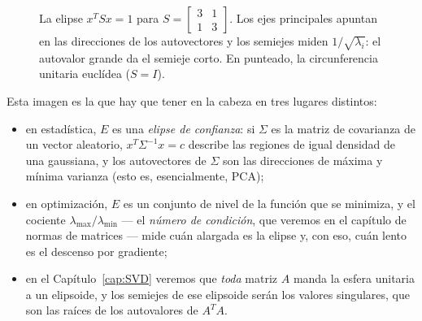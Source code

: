 \begin{figure}[htbp]
\centering
{}
\caption{La elipse $x^TSx=1$ para $S=\left[\begin{smallmatrix}3&1\\1&3\end{smallmatrix}\right]$.
Los ejes principales apuntan en las direcciones de los autovectores y los
semiejes miden $1/\sqrt{\lambda_i}$: el autovalor grande da el semieje corto.
En punteado, la circunferencia unitaria euclídea ($S=I$).}
\label{fig:elipse}
\end{figure}

Esta imagen es la que hay que tener en la cabeza en tres lugares distintos:

\begin{itemize}
\item en estadística, $E$ es una \emph{elipse de confianza}: si $\Sigma$ es la
matriz de covarianza de un vector aleatorio, $x^T\Sigma^{-1}x = c$ describe
las regiones de igual densidad de una gaussiana, y los autovectores de
$\Sigma$ son las direcciones de máxima y mínima varianza (esto es,
esencialmente, PCA);
\item en optimización, $E$ es un conjunto de nivel de la función que se
minimiza, y el cociente $\lambda_{\max}/\lambda_{\min}$ --- el
\emph{número de condición}, que veremos en el capítulo de normas de
matrices --- mide
cuán alargada es la elipse y, con eso, cuán lento es el descenso por gradiente;
\item en el Capítulo~\ref{cap:SVD} veremos que \emph{toda} matriz $A$ manda la
esfera unitaria a un elipsoide, y los semiejes de ese elipsoide serán los
valores singulares, que son las raíces de los autovalores de $A^TA$.
\end{itemize}


